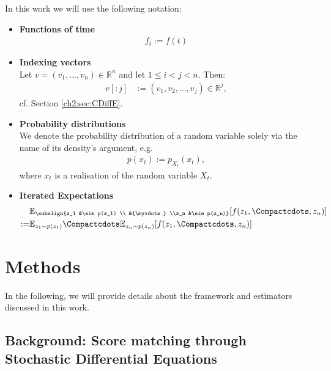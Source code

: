 In this work we will use the following notation:
\begin{itemize}
    \item \textbf{Functions of time}
    \begin{gather*}
        f_t := f(t)
    \end{gather*}
    \item \textbf{Indexing vectors} \\
    Let $v = (v_1, ..., v_n) \in \mathbb{R}^n$ and let $ 1 \leq i < j < n$. Then:
    \begin{align*}
        v[:j] &:= (v_1, v_{2}, ..., v_j) \in \mathbb{R}^{j},
    \end{align*}
    cf. Section \ref{ch2:sec:CDiffE}.
    \item \textbf{Probability distributions} \\
    We denote the probability distribution of a random variable solely via the name of its density's argument, e.g.
    \begin{gather*}
        p(x_t) := p_{X_t}(x_t),
    \end{gather*}   
    where $x_t$ is a realisation of the random variable $X_t$.
    \item \textbf{Iterated Expectations}
    \begin{align*}
        &\mathbb{E}_{\subalign{z_1 &\sim p(z_1) \\ &{\myvdots} \\z_n &\sim p(z_n)}}[f(z_1,\Compactcdots,z_n)] \\
        :=&\mathbb{E}_{z_1 \sim p(z_1)} \Compactcdots \mathbb{E}_{z_n \sim p(z_n)}[f(z_1,\Compactcdots,z_n)]
    \end{align*}
\end{itemize} 

\section{Methods}
In the following, we will provide details about the framework and estimators discussed in this work.
\subsection{Background: Score matching through Stochastic Differential Equations}
